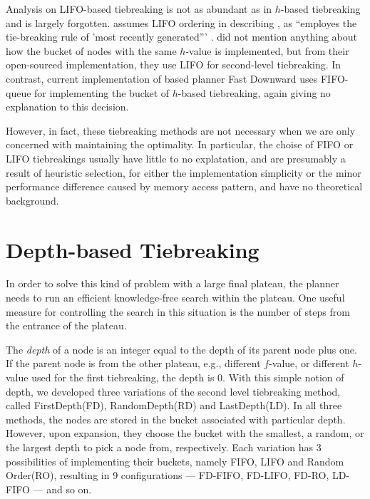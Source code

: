 Analysis on LIFO-based tiebreaking is not as abundant as in $h$-based
tiebreaking and is largely forgotten.
\citeauthor{Korf1985depth} assumes LIFO ordering in describing \astar,
as ``\astar employes the tie-breaking rule of 'most
recently generated''' \cite{Korf1985depth}.
\citeauthor{burns2012implementing} did not mention anything about how
the bucket of nodes with the same $h$-value is implemented, but from their
open-sourced implementation, they use LIFO for second-level tiebreaking. 
In contrast, current implementation of \sota \astar based planner Fast
Downward \cite{Helmert2006} uses FIFO-queue for implementing the bucket
of $h$-based tiebreaking, again giving no explanation to this decision.


However, in fact, these tiebreaking methods are not necessary when we
are only concerned with maintaining the optimality. In particular, the
choise of FIFO or LIFO tiebreakings usually have little to no
explatation, and are presumably a result of heuristic selection, for
either the implementation simplicity or the minor performance difference
caused by memory access pattern, and have no theoretical background.








\section{Depth-based Tiebreaking}

In order to solve this kind of problem with a large final plateau, the
planner needs to run an efficient knowledge-free search within the
plateau.  One useful measure for controlling the search in this
situation is the number of steps from the entrance of the plateau.

The \emph{depth} of a node is an integer equal to the depth of its
parent node plus one. If the parent node is from the other plateau,
e.g., different $f$-value, or different $h$-value used for the first
tiebreaking, the depth is 0.  With this simple notion of depth, we
developed three variations of the second level tiebreaking method,
called FirstDepth(FD), RandomDepth(RD) and LastDepth(LD). In all three
methods, the nodes are stored in the bucket associated with particular
depth.  However, upon expansion, they choose the bucket with the smallest,
a random, or the largest depth to pick a node from, respectively.
Each variation has 3 possibilities of implementing their buckets, namely
FIFO, LIFO and Random Order(RO), resulting in 9 configurations ---
FD-FIFO, FD-LIFO, FD-RO, LD-FIFO --- and so on.



